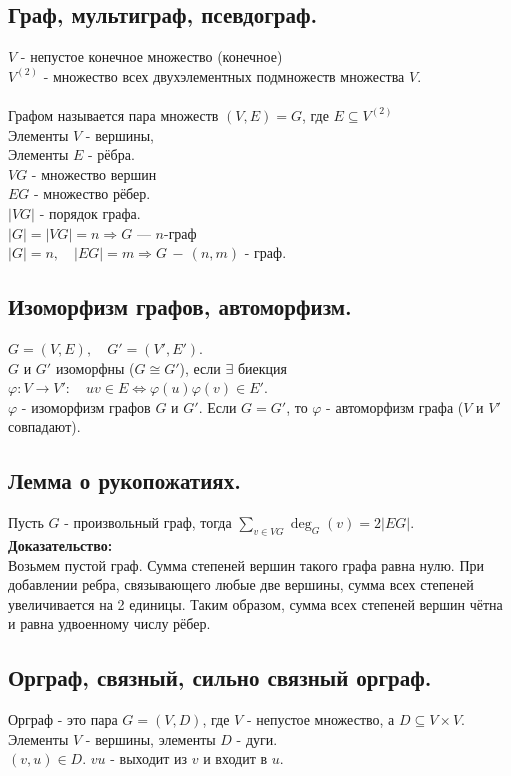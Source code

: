 \documentclass[12pt]{article}
\begin{document}
\subsection{Граф, мультиграф, псевдограф.}
	$V$ - непустое конечное множество (конечное)\\
	$V^{(2)}$ - множество всех двухэлементных подмножеств множества $V$.\\ \\
	Графом называется пара множеств $(V,E) = G$, где $E \subseteq V^{(2)}$\\
	Элементы $V$ - вершины,\\
	Элементы $E$ - рёбра.\\
	$VG$ - множество вершин\\
	$EG$ - множество рёбер.\\
	$|VG|$ - порядок графа.\\
	$|G| = |VG|=n  \Rightarrow G$ — $n$-граф\\
	$|G|=n, \quad |EG|=m \Rightarrow G\,-\, (n,m)$ - граф.\\
\subsection{Изоморфизм графов, автоморфизм.}
	$G=(V,E), \quad G'=(V', E')$.\\
	$G$ и $G'$ изоморфны ($ G \cong G'$), если $\exists$ биекция $\varphi:V \rightarrow V': \quad uv \in E \Leftrightarrow \varphi(u)\varphi(v) \in E'$.\\
	$\varphi$ - изоморфизм графов $G$ и $G'$.
	Если $G=G'$, то $\varphi$ - автоморфизм графа ($V$ и $V'$ совпадают).
\subsection{Лемма о рукопожатиях.}
	Пусть $G$ - произвольный граф, тогда $ \displaystyle \sum_{v \in VG}  \operatorname{deg}_G(v) = 2|EG|$.\\
	\textbf{Доказательство:}\\
		Возьмем пустой граф. Сумма степеней вершин такого графа равна нулю. При добавлении ребра, связывающего любые две вершины, сумма всех степеней увеличивается на 2 единицы. Таким образом, сумма всех степеней вершин чётна и равна удвоенному числу рёбер.\\ 
	\qedsymbol
\subsection{Орграф, связный, сильно связный орграф.}
	Орграф - это пара $G=(V,D)$, где $V$ - непустое множество, а $D \subseteq V \times V$. Элементы $V$ - вершины, элементы $D$ - дуги.\\
	$(v,u) \in D$. $vu$ - выходит из $v$ и входит в $u$.\\\\
\end{document}
